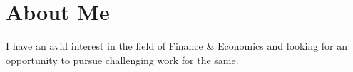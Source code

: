 \documentclass[12pt,a4paper,sans]{moderncv}
\begin{document}
 	\makecvtitle
 	\vspace{-30pt} %
 	\section{\hspace{10em} About Me}{I have an avid interest in the field of Finance \& Economics and looking for an opportunity to pursue challenging work for the same.}	 %
	 \vspace{-10pt} %
	 
	 \vspace{-10pt}
	 
	 \vspace{-10pt} %
	 
	 \vspace{-10pt} %
	 
	 \pagebreak
	 \vspace{-10pt} %
	 
	 \vspace{-10pt} %
	 
	 \vspace{-10pt} %
	 

 
\end{document}

